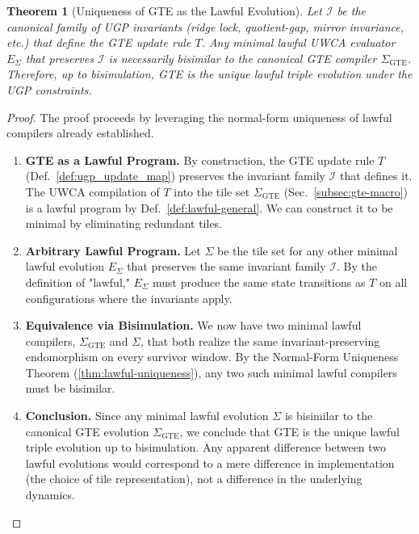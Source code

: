 \documentclass[12pt]{article}
\newtheorem{theorem}{Theorem}[section]
\numberwithin{equation}{section}
\begin{document}
\begin{theorem}[Uniqueness of GTE as the Lawful Evolution]\label{thm:gte-uniqueness}
Let $\mathcal{I}$ be the canonical family of UGP invariants (ridge lock, quotient-gap, mirror invariance, etc.) that define the GTE update rule $T$. Any minimal lawful UWCA evaluator $E_\Sigma$ that preserves $\mathcal{I}$ is necessarily bisimilar to the canonical GTE compiler $\Sigma_{\mathrm{GTE}}$. Therefore, up to bisimulation, GTE is the \emph{unique} lawful triple evolution under the UGP constraints.
\end{theorem}

\begin{proof}
The proof proceeds by leveraging the normal-form uniqueness of lawful compilers already established.
\begin{enumerate}[leftmargin=1.5em, itemsep=2pt]
    \item \textbf{GTE as a Lawful Program.} By construction, the GTE update rule $T$ (Def.~\ref{def:ugp_update_map}) preserves the invariant family $\mathcal{I}$ that defines it. The UWCA compilation of $T$ into the tile set $\Sigma_{\mathrm{GTE}}$ (Sec.~\ref{subsec:gte-macro}) is a lawful program by Def.~\ref{def:lawful-general}. We can construct it to be minimal by eliminating redundant tiles.

    \item \textbf{Arbitrary Lawful Program.} Let $\Sigma$ be the tile set for any other minimal lawful evolution $E_\Sigma$ that preserves the same invariant family $\mathcal{I}$. By the definition of "lawful," $E_\Sigma$ must produce the same state transitions as $T$ on all configurations where the invariants apply.

    \item \textbf{Equivalence via Bisimulation.} We now have two minimal lawful compilers, $\Sigma_{\mathrm{GTE}}$ and $\Sigma$, that both realize the same invariant-preserving endomorphism on every survivor window. By the Normal-Form Uniqueness Theorem (\ref{thm:lawful-uniqueness}), any two such minimal lawful compilers must be bisimilar.

    \item \textbf{Conclusion.} Since any minimal lawful evolution $\Sigma$ is bisimilar to the canonical GTE evolution $\Sigma_{\mathrm{GTE}}$, we conclude that GTE is the unique lawful triple evolution up to bisimulation. Any apparent difference between two lawful evolutions would correspond to a mere difference in implementation (the choice of tile representation), not a difference in the underlying dynamics.
\end{enumerate}
\end{proof}
\end{document}
